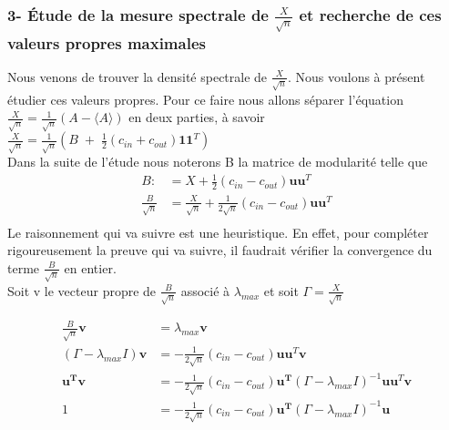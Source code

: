 \subsubsection*{3- Étude de la mesure spectrale de $\frac{X}{\sqrt{n}}$ et recherche de ces valeurs propres maximales}
Nous venons de trouver la densité spectrale de $\frac{X}{\sqrt{n}}$.
Nous voulons à présent étudier ces valeurs propres.
Pour ce faire nous allons séparer l'équation $\frac{X}{\sqrt{n}} = \frac{1}{\sqrt{n}}(A - \langle A \rangle)$ en deux parties, à savoir $\frac{X}{\sqrt{n}} = \frac{1}{\sqrt{n}}(B \;+\; \frac{1}{2}(c_{in} + c_{out})\mathbf{11}^T)$\\
Dans la suite de l'étude nous noterons B la matrice de modularité telle que 
\begin{align*} 
B :&= X + \frac{1}{2}(c_{in} - c_{out})\mathbf{uu}^T \\
\frac{B}{\sqrt{n}} &= \frac{X}{\sqrt{n}} + \frac{1}{2\sqrt{n}}(c_{in} - c_{out})\mathbf{uu}^T\\
\end{align*}
Le raisonnement qui va suivre est une heuristique. En effet, pour compléter rigoureusement la preuve qui va suivre, il faudrait vérifier la convergence du terme $\frac{B}{\sqrt{n}}$ en entier.\\

Soit v le vecteur propre de $\frac{B}{\sqrt{n}}$ associé à $\lambda_{max}$ et soit $\Gamma = \frac{X}{\sqrt{n}}$

\begin{align} 
\frac{B}{\sqrt{n}}\mathbf{v} &= \lambda_{max}\mathbf{v} \nonumber\\
(\Gamma - \lambda_{max}I)\mathbf{v} &= -\frac{1}{2\sqrt{n}}(c_{in} - c_{out})\mathbf{uu}^T \mathbf{v} \nonumber\\
 \mathbf{u^Tv} &= -\frac{1}{2\sqrt{n}}(c_{in} - c_{out})\mathbf{u^T}(\Gamma - \lambda_{max}I)^{-1}\mathbf{uu}^T \mathbf{v} \nonumber\\
 1 &= -\frac{1}{2\sqrt{n}}(c_{in} - c_{out})\mathbf{u^T}(\Gamma - \lambda_{max}I)^{-1}\mathbf{u} \label{eq:3}
\end{align}

